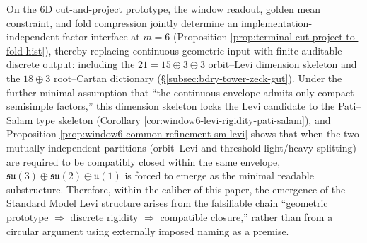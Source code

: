 \begin{remark}[Avoiding Logical Circularity: The ``Geometry \texorpdfstring{$\Rightarrow$}{=>} Rigidity \texorpdfstring{$\Rightarrow$}{=>} SM'' Chain (Window-\(6\))]\label{rem:window6-geometry-rigidity-to-sm-non-circular}
On the 6D cut-and-project prototype, the window readout, golden mean constraint, and fold compression jointly determine an implementation-independent factor interface at \(m=6\) (Proposition \ref{prop:terminal-cut-project-to-fold-hist}),
thereby replacing continuous geometric input with finite auditable discrete output: including the \(21=15\oplus 3\oplus 3\) orbit--Levi dimension skeleton and the \(18\oplus 3\) root--Cartan dictionary (\S\ref{subsec:bdry-tower-zeck-gut}).
Under the further minimal assumption that ``the continuous envelope admits only compact semisimple factors,'' this dimension skeleton locks the Levi candidate to the Pati--Salam type skeleton (Corollary \ref{cor:window6-levi-rigidity-pati-salam}),
and Proposition \ref{prop:window6-common-refinement-sm-levi} shows that when the two mutually independent partitions (orbit--Levi and threshold light/heavy splitting) are required to be compatibly closed within the same envelope,
\(\mathfrak{su}(3)\oplus\mathfrak{su}(2)\oplus\mathfrak u(1)\) is forced to emerge as the minimal readable substructure.
Therefore, within the caliber of this paper, the emergence of the Standard Model Levi structure arises from the falsifiable chain ``geometric prototype \(\Rightarrow\) discrete rigidity \(\Rightarrow\) compatible closure,'' rather than from a circular argument using externally imposed naming as a premise.
\end{remark}

